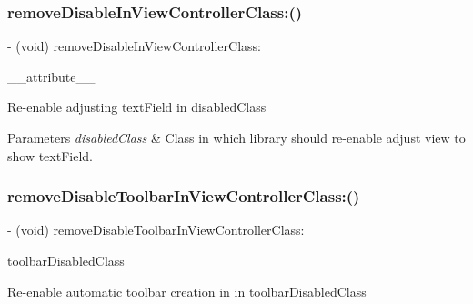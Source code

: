 \subsubsection{\texorpdfstring{remove\+Disable\+In\+View\+Controller\+Class\+:()}{removeDisableInViewControllerClass:()}\hspace{0.1cm}{\footnotesize\ttfamily [3/3]}}
{\footnotesize\ttfamily -\/ (void) remove\+Disable\+In\+View\+Controller\+Class\+: \begin{DoxyParamCaption}\item[{((deprecated(\char`\"{}This method is replaced with remove\+Disable\+Distance\+Handling\+In\+View\+Controller\+Class\+: method to adopt more graceful method name. Some developers confuses with this method name. This method will be removed in upcoming release.\char`\"{})))}]{\+\_\+\+\_\+attribute\+\_\+\+\_\+ }\end{DoxyParamCaption}}

Re-\/enable adjusting text\+Field in disabled\+Class


\begin{DoxyParams}{Parameters}
{\em disabled\+Class} & Class in which library should re-\/enable adjust view to show text\+Field. \\
\hline
\end{DoxyParams}
\mbox{\label{interface_i_q_keyboard_manager_a71d38785360ac94f27319b3bf9119d9e}} 
\subsubsection{\texorpdfstring{remove\+Disable\+Toolbar\+In\+View\+Controller\+Class\+:()}{removeDisableToolbarInViewControllerClass:()}\hspace{0.1cm}{\footnotesize\ttfamily [1/3]}}
{\footnotesize\ttfamily -\/ (void) remove\+Disable\+Toolbar\+In\+View\+Controller\+Class\+: \begin{DoxyParamCaption}\item[{(nonnull Class)}]{toolbar\+Disabled\+Class }\end{DoxyParamCaption}}

Re-\/enable automatic toolbar creation in in toolbar\+Disabled\+Class


